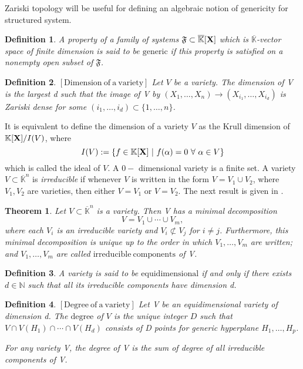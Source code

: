 \documentclass[11pt]{article}
\numberwithin{Property}{section}
\newtheorem{Theorem}{Theorem}%
\numberwithin{Theorem}{section}
\numberwithin{Proposition}{section}
\numberwithin{Lemma}{section}
\numberwithin{Corollary}{section}
\newtheorem{Definition}{Definition}%
\numberwithin{Definition}{section}
\numberwithin{Remark}{section}
\numberwithin{Conjecture}{section}
\numberwithin{Problem}{section}
\numberwithin{Example}{section}
\numberwithin{Claim}{section}
\def\bar{\overline}
\newcommand{\field}{\mathbb{K}} %
\newcommand{\mat}[1]{\mathbf{\MakeUppercase{#1}}} %
\begin{document}
Zariski topology will be useful for defining an algebraic notion of genericity for structured system. 
\begin{Definition} A property of a family of systems $\mathfrak{F} \subset \bar{\field}[\mat{X}]$ which is $\bar{\field}$-vector space of finite dimension is said to be $\mathrm{generic}$ if this property is satisfied on a nonempty open subset of $\mathfrak{F}$.
\end{Definition}
\begin{Definition}$\mathrm{[Dimension \ of \ a \ variety]}$ Let $V$ be a variety. The dimension of V is the largest d such that the image of V by $(X_1, \ldots, X_n) \to (X_{i_1}, \ldots, X_{i_d})$ is Zariski dense for some $(i_1, \ldots, i_d) \subset \{1, \ldots, n\}$.
\end{Definition}
It is equivalent to define the dimension of a variety $V$ as the Krull dimension of $\field[\mat{X}]/I(V)$, where \[I(V) := \{f \in \field[\mat{X}] \ | \ f(\alpha) = 0 \ \forall \ \alpha \in V\}\]
 which is called the ideal of $V$. A $0 -$ dimensional variety is a finite set. A variety $V \subset \bar{\field}^n$ is \emph{irreducible} if whenever $V$ is written in the form $V = V_1 \cup V_2$, where $V_1, V_2$ are varieties, then either $V = V_1$ or $V = V_2$. The next result is given in \cite[Theorem~4 -- section~6 -- chapter~4]{Cox07}.
\begin{Theorem} Let $V \subset \bar{\field}^{n}$ is a variety. Then V has a minimal decomposition 
\[
V = V_1 \cup \cdots \cup V_m,
\] where each $V_i$ is an irreducible variety and $V_i \not\subset V_j$ for $i \ne j$. Furthermore, this minimal decomposition is unique up to the order in which $V_1, \ldots, V_m$ are written; and $V_1, \ldots, V_m$ are called $\mathrm{irreducible \ components}$ of V.
\end{Theorem}
\begin{Definition} A variety is said to be $\mathrm{equidimensional}$ if and only if there exists $d \in \mathbb{N}$ such that all its irreducible components have dimension d. 
\end{Definition}
\begin{Definition}$\mathrm{[Degree \ of \ a \ variety]}$ Let V be an equidimensional variety of dimension d. The $\mathrm{degree}$ of $V$ is the unique integer $D$ such that $V \cap V(H_1) \cap \cdots \cap V(H_d)$ consists of D points for generic hyperplane $H_1, \ldots, H_p$. 

For any variety V, the degree of V is the sum of degree of all irreducible components of V. 
\end{Definition}
\end{document}
